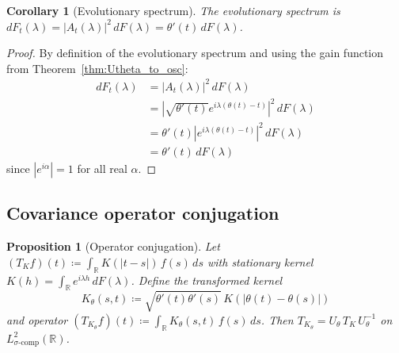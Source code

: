 \documentclass{article}
\newtheorem{corollary}[theorem]{Corollary}
\newtheorem{proposition}[theorem]{Proposition}
\begin{document}
\begin{corollary}[Evolutionary spectrum]\label{cor:evol_spec}
The evolutionary spectrum is $dF_t(\lambda)=|A_t(\lambda)|^2\,dF(\lambda)=\theta'(t)\,dF(\lambda)$.
\end{corollary}

\begin{proof}
By definition of the evolutionary spectrum and using the gain function from Theorem~\ref{thm:Utheta_to_osc}:
\begin{align}
dF_t(\lambda) &= |A_t(\lambda)|^2\,dF(\lambda)\\
&= \left|\sqrt{\theta'(t)}e^{i\lambda(\theta(t)-t)}\right|^2\,dF(\lambda)\\
&= \theta'(t)|e^{i\lambda(\theta(t)-t)}|^2\,dF(\lambda)\\
&= \theta'(t)\,dF(\lambda)
\end{align}
since $|e^{i\alpha}|=1$ for all real $\alpha$.
\end{proof}

\subsection{Covariance operator conjugation}
\begin{proposition}[Operator conjugation]\label{prop:conjugation}
Let $(T_K f)(t)\coloneqq \int_{\mathbb{R}} K(|t-s|)\,f(s)\,ds$ with stationary kernel $K(h)=\int_{\mathbb{R}} e^{i\lambda h}\,dF(\lambda)$. Define the transformed kernel
\[
K_\theta(s,t)\coloneqq \sqrt{\theta'(t)\theta'(s)}\,K\!\left(|\theta(t)-\theta(s)|\right)
\]
and operator $(T_{K_\theta}f)(t)\coloneqq \int_{\mathbb{R}} K_\theta(s,t)\,f(s)\,ds$.
Then $T_{K_\theta}=U_\theta\,T_K\,U_\theta^{-1}$ on $L^2_{\sigma\text{-comp}}(\mathbb{R})$.
\end{proposition}
\end{document}
